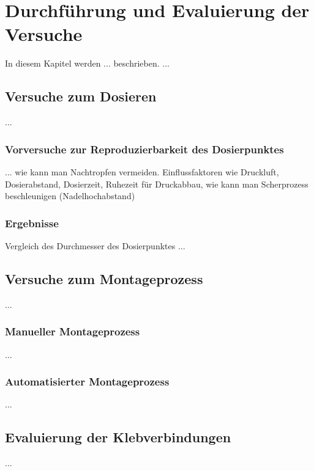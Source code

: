 \chapter{Durchführung und Evaluierung der Versuche}
In diesem Kapitel werden ... beschrieben.
...

\section{Versuche zum Dosieren}
\label{sec:Versuche zum Dosieren}
...

\subsection{Vorversuche zur Reproduzierbarkeit des Dosierpunktes}
\label{sec: Vorversuche zur Reproduzierbarkeit des Dosierpunktes}
...
wie kann man Nachtropfen vermeiden.
Einflussfaktoren wie Druckluft, Dosierabstand, Dosierzeit, Ruhezeit für Druckabbau, wie kann man Scherprozess beschleunigen (Nadelhochabstand)

\subsection{Ergebnisse}
Vergleich des Durchmesser des Dosierpunktes
...

\section{Versuche zum Montageprozess}

...

\subsection{Manueller Montageprozess}
\label{sec: ManuellerMontageprozess}
...

\subsection{Automatisierter Montageprozess}
...

\section{Evaluierung der Klebverbindungen}
...

